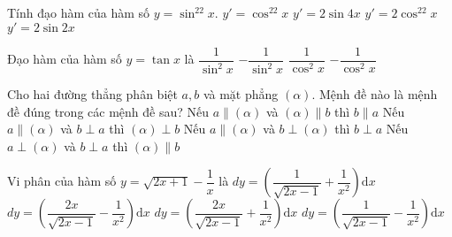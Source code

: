 \begin{ex}%
Tính đạo hàm của hàm số $y=\sin^22x$.
\choice
{$y'=\cos^22x$}
{\True $y'=2\sin4x$}
{$y'=2\cos^22x$}
{$y'=2\sin2x$}
\end{ex}

\begin{ex}%
	Đạo hàm của hàm số $y = \tan x$ là
	\choice
	{$\dfrac{1}{\sin^2 x}$}
            {$-\dfrac{1}{\sin^2 x}$}
            {\True $\dfrac{1}{\cos^2 x}$}
            {$-\dfrac{1}{\cos^2 x}$}
\end{ex}

\begin{ex}%
	Cho hai đường thẳng phân biệt $a,b$ và mặt phẳng $(\alpha)$. Mệnh đề nào là mệnh đề đúng trong các mệnh đề sau?
	\choice
	{Nếu $a \parallel (\alpha)$ và $(\alpha) \parallel b$ thì $b \parallel a$}
	{Nếu $a \parallel (\alpha)$ và $b \perp a $ thì $(\alpha) \perp b$}
	{\True Nếu $a \parallel (\alpha)$ và $b \perp (\alpha)$ thì $b \perp a$}
	{Nếu $a\perp (\alpha)$ và $b \perp a$ thì $(\alpha) \parallel b$}
\end{ex}

\begin{ex}%
	Vi phân của hàm số $y = \sqrt{2x + 1} - \dfrac{1}{x}$ là 
	\choice
	{\True $dy = \left( \dfrac{1}{\sqrt{2x - 1}} + \dfrac{1}{x^2} \right) \mathrm{d}x$}
	{$dy = \left( \dfrac{2x}{\sqrt{2x - 1}} - \dfrac{1}{x^2} \right) \mathrm{d}x$}
	{$dy = \left( \dfrac{2x}{\sqrt{2x - 1}} + \dfrac{1}{x^2} \right) \mathrm{d}x$}
	{$dy = \left( \dfrac{1}{\sqrt{2x - 1}} - \dfrac{1}{x^2} \right) \mathrm{d}x$}
\end{ex}

